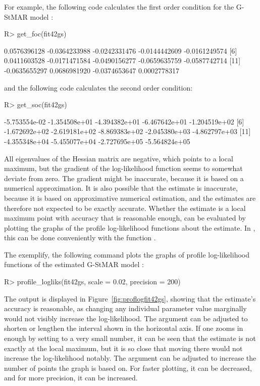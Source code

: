 \documentclass[nojss]{jss} %
\begin{document}
For example, the following code calculates the first order condition for the G-StMAR model :
%
\begin{CodeChunk}
\begin{CodeInput}
R> get_foc(fit42gs)
\end{CodeInput}
\begin{CodeOutput}
 [1]  0.0576396128 -0.0364233988 -0.0242331476 -0.0144442609 -0.0161249574
 [6]  0.0411603528 -0.0171471584 -0.0490156277 -0.0659635759 -0.0587742714
[11] -0.0635655297  0.0686981920 -0.0374653647  0.0002778317
\end{CodeOutput}
\end{CodeChunk}
%
and the following code calculates the second order condition:
%
\begin{CodeChunk}
\begin{CodeInput}
R> get_soc(fit42gs)
\end{CodeInput}
\begin{CodeOutput}
 [1] -5.753554e-02 -1.354508e+01 -4.394382e+01 -6.467642e+01 -1.204519e+02
 [6] -1.672692e+02 -2.619181e+02 -8.869383e+02 -2.045380e+03 -4.862797e+03
[11] -4.355348e+04 -5.455077e+04 -2.727695e+05 -5.564824e+05
\end{CodeOutput}
\end{CodeChunk}
%
All eigenvalues of the Hessian matrix are negative, which points to a local maximum, but the gradient of the log-likelihood function seems to somewhat deviate from zero. The gradient might be inaccurate, because it is based on a numerical approximation. It is also possible that the estimate is inaccurate, because it is based on approximative numerical estimation, and the estimates are therefore not expected to be exactly accurate. Whether the estimate is a local maximum point with accuracy that is reasonable enough, can be evaluated by plotting the graphs of the profile log-likelihood functions about the estimate. In , this can be done conveniently with the function .

The exemplify, the following command plots the graphs of profile log-likelihood functions of the estimated G-StMAR model :
%
\begin{CodeChunk}
\begin{CodeInput}
R> profile_logliks(fit42gs, scale = 0.02, precision = 200)
\end{CodeInput}
\end{CodeChunk}
%
The output is displayed in Figure~\ref{fig:proflogfit42gs}, showing that the estimate's accuracy is reasonable, as changing any individual parameter value marginally would not visibly increase the log-likelihood. The argument  can be adjusted to shorten or lengthen the interval shown in the horizontal axis. If one zooms in enough by setting  to a very small number, it can be seen that the estimate is not exactly at the local maximum, but it is so close that moving there would not increase the log-likelihood notably. The argument  can be adjusted to increase the number of points the graph is based on. For faster plotting, it can be decreased, and for more precision, it can be increased.
\end{document}
